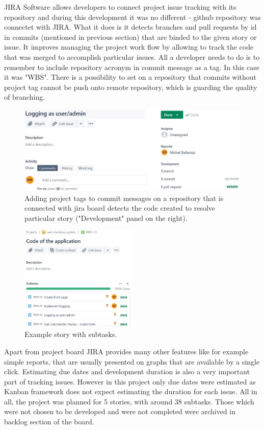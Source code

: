 \documentclass[a4paper,12pt]{book}
\begin{document}
{JIRA Software allows developers to connect project issue tracking with its repository and during this development it was no different - github repository was connectet with JIRA. What it does is it detects branches and pull requests by id in commits (mentioned in previous section) that are binded to the given story or issue. It improves managing the project work flow by allowing to track the code that was merged to accomplish particular issues. All a developer needs to do is to remember to include repository acronym in commit message as a tag. In this case it was "WBS". There is a possibility to set on a repository that commits without project tag cannot be push onto remote repository, which is guarding the quality of branching.

\begin{figure}[h]
  \centering
    \includegraphics[width=1.0\textwidth]{issue}
    \caption{Adding project tags to commit messages on a repository that is connected with jira board detects the code created to resolve particular story ("Development" panel on the right).~\cite{jiraboard}}
\end{figure} 
    
\begin{figure}[h]
  \centering
    \includegraphics[width=0.5\textwidth]{applicationstory}
    \caption{Example story with subtasks.~\cite{jiraboard}}
\end{figure}
    
\bigskip
Apart from project board JIRA provides many other features like for example simple reports, that are usually presented on graphs that are available by a single click.      
Estimating due dates and development duration is also a very important part of tracking issues. However in this project only due dates were estimated  as Kanban framework does not expect estimating the duration for each issue. All in all, the project was planned for 5 stories, with around 38 subtasks. Those which were not chosen to be developed and were not completed were archived in backlog section of the board.

}
\end{document}
